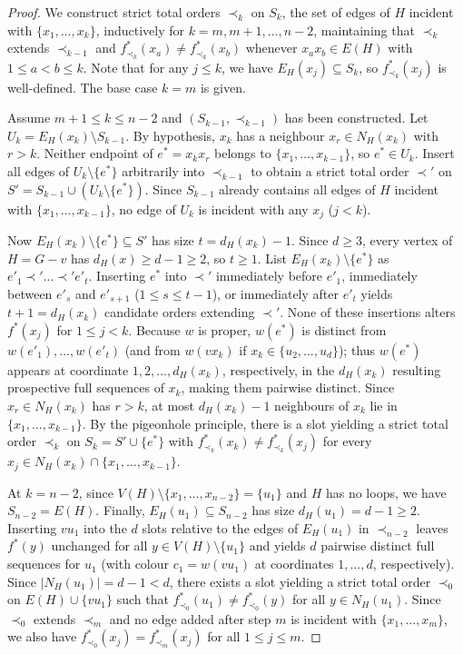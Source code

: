 \documentclass[11pt,a4paper]{article}
\begin{document}
\begin{proof}
We construct strict total orders $\prec_k$ on $S_k$, the set of edges of $H$ incident with $\{x_1, \dots, x_k\}$, inductively for $k = m, m + 1, \dots, n - 2$, maintaining that $\prec_k$ extends $\prec_{k-1}$ and $f^*_{\prec_k}(x_a) \neq f^*_{\prec_k}(x_b)$ whenever $x_a x_b \in E(H)$ with $1 \le a < b \le k$. Note that for any $j \le k$, we have $E_H(x_j) \subseteq S_k$, so $f^*_{\prec_k}(x_j)$ is well-defined. The base case $k = m$ is given.

Assume $m + 1 \le k \le n - 2$ and $(S_{k-1}, \prec_{k-1})$ has been constructed. Let $U_k = E_H(x_k) \setminus S_{k-1}$. By hypothesis, $x_k$ has a neighbour $x_r \in N_H(x_k)$ with $r > k$. Neither endpoint of $e^* = x_k x_r$ belongs to $\{x_1, \dots, x_{k-1}\}$, so $e^* \in U_k$. Insert all edges of $U_k \setminus \{e^*\}$ arbitrarily into $\prec_{k-1}$ to obtain a strict total order $\prec'$ on $S' = S_{k-1} \cup (U_k \setminus \{e^*\})$. Since $S_{k-1}$ already contains all edges of $H$ incident with $\{x_1, \dots, x_{k-1}\}$, no edge of $U_k$ is incident with any $x_j$ ($j < k$).

Now $E_H(x_k) \setminus \{e^*\} \subseteq S'$ has size $t = d_H(x_k) - 1$. Since $d \ge 3$, every vertex of $H = G - v$ has $d_H(x) \ge d - 1 \ge 2$, so $t \ge 1$. List $E_H(x_k) \setminus \{e^*\}$ as $e'_1 \prec' \dots \prec' e'_t$. Inserting $e^*$ into $\prec'$ immediately before $e'_1$, immediately between $e'_s$ and $e'_{s+1}$ ($1 \le s \le t - 1$), or immediately after $e'_t$ yields $t + 1 = d_H(x_k)$ candidate orders extending $\prec'$. None of these insertions alters $f^*(x_j)$ for $1 \le j < k$. Because $w$ is proper, $w(e^*)$ is distinct from $w(e'_1), \dots, w(e'_t)$ (and from $w(v x_k)$ if $x_k \in \{u_2, \dots, u_d\}$); thus $w(e^*)$ appears at coordinate $1, 2, \dots, d_H(x_k)$, respectively, in the $d_H(x_k)$ resulting prospective full sequences of $x_k$, making them pairwise distinct. Since $x_r \in N_H(x_k)$ has $r > k$, at most $d_H(x_k) - 1$ neighbours of $x_k$ lie in $\{x_1, \dots, x_{k-1}\}$. By the pigeonhole principle, there is a slot yielding a strict total order $\prec_k$ on $S_k = S' \cup \{e^*\}$ with $f^*_{\prec_k}(x_k) \neq f^*_{\prec_k}(x_j)$ for every $x_j \in N_H(x_k) \cap \{x_1, \dots, x_{k-1}\}$.

At $k = n - 2$, since $V(H) \setminus \{x_1, \dots, x_{n-2}\} = \{u_1\}$ and $H$ has no loops, we have $S_{n-2} = E(H)$. Finally, $E_H(u_1) \subseteq S_{n-2}$ has size $d_H(u_1) = d - 1 \ge 2$. Inserting $v u_1$ into the $d$ slots relative to the edges of $E_H(u_1)$ in $\prec_{n-2}$ leaves $f^*(y)$ unchanged for all $y \in V(H) \setminus \{u_1\}$ and yields $d$ pairwise distinct full sequences for $u_1$ (with colour $c_1 = w(v u_1)$ at coordinates $1, \dots, d$, respectively). Since $|N_H(u_1)| = d - 1 < d$, there exists a slot yielding a strict total order $\prec_0$ on $E(H) \cup \{v u_1\}$ such that $f^*_{\prec_0}(u_1) \neq f^*_{\prec_0}(y)$ for all $y \in N_H(u_1)$. Since $\prec_0$ extends $\prec_m$ and no edge added after step $m$ is incident with $\{x_1, \dots, x_m\}$, we also have $f^*_{\prec_0}(x_j) = f^*_{\prec_m}(x_j)$ for all $1 \le j \le m$.
\end{proof}
\end{document}
